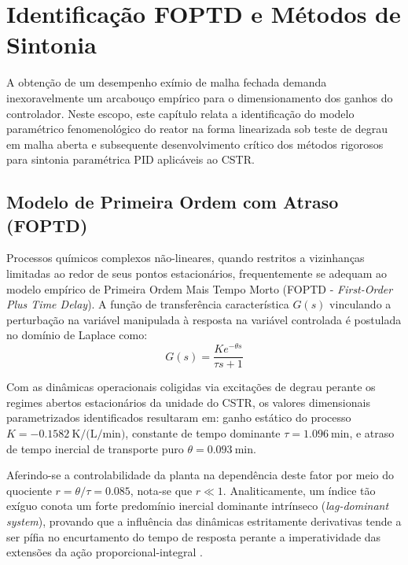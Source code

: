\chapter{Identificação FOPTD e Métodos de Sintonia}
\label{cap:identificacao_sintonia}

A obtenção de um desempenho exímio de malha fechada demanda inexoravelmente um arcabouço empírico para o dimensionamento dos ganhos do controlador. Neste escopo, este capítulo relata a identificação do modelo paramétrico fenomenológico do reator na forma linearizada sob teste de degrau em malha aberta e subsequente desenvolvimento crítico dos métodos rigorosos para sintonia paramétrica PID aplicáveis ao CSTR.

\section{Modelo de Primeira Ordem com Atraso (FOPTD)}
\label{sec:modelo_foptd}

Processos químicos complexos não-lineares, quando restritos a vizinhanças limitadas ao redor de seus pontos estacionários, frequentemente se adequam ao modelo empírico de Primeira Ordem Mais Tempo Morto (FOPTD - \textit{First-Order Plus Time Delay}). A função de transferência característica $G(s)$ vinculando a perturbação na variável manipulada à resposta na variável controlada é postulada no domínio de Laplace como:
\begin{equation}
    G(s) = \frac{K e^{-\theta s}}{\tau s + 1}
\end{equation}

Com as dinâmicas operacionais coligidas via excitações de degrau perante os regimes abertos estacionários da unidade do CSTR, os valores dimensionais parametrizados identificados resultaram em: 
ganho estático do processo $K = \SI{-0.1582}{\kelvin\per(\liter\per\minute)}$,
constante de tempo dominante $\tau = \SI{1.096}{\minute}$,
e atraso de tempo inercial de transporte puro $\theta = \SI{0.093}{\minute}$.

Aferindo-se a controlabilidade da planta na dependência deste fator por meio do quociente $r = \theta/\tau = 0.085$, nota-se que $r \ll 1$. Analiticamente, um índice tão exíguo conota um forte predomínio inercial dominante intrínseco (\textit{lag-dominant system}), provando que a influência das dinâmicas estritamente derivativas tende a ser pífia no encurtamento do tempo de resposta perante a imperatividade das extensões da ação proporcional-integral \cite{Astrom2006}.

